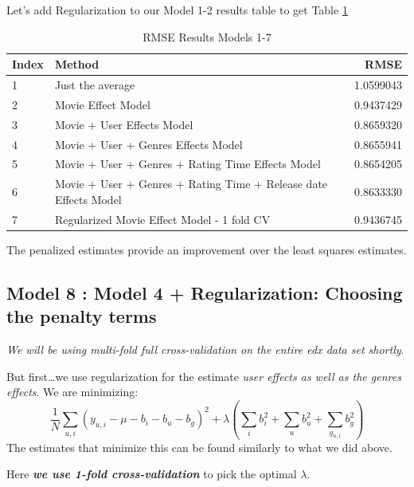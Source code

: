 \documentclass[
]{article}
\begin{document}
Let's add Regularization to our Model 1-2 results table to get Table
\ref{tbl:rmse_results_model_1-7}

\begin{table}[H]

\caption{\label{tab:m7_7}RMSE Results Models 1-7\label{tbl:rmse_results_model_1-7}}
\centering
\fontsize{7}{9}\selectfont
\begin{tabular}[t]{llr}
\toprule
Index & Method & RMSE\\
\midrule
1 & Just the average & 1.0599043\\
2 & Movie Effect Model & 0.9437429\\
3 & Movie + User Effects Model & 0.8659320\\
4 & Movie + User + Genres Effects Model & 0.8655941\\
5 & Movie + User + Genres + Rating Time Effects Model & 0.8654205\\
6 & Movie + User + Genres + Rating Time + Release date Effects Model & 0.8633330\\
7 & Regularized Movie Effect Model - 1 fold CV & 0.9436745\\
\bottomrule
\end{tabular}
\end{table}

The penalized estimates provide an improvement over the least squares
estimates.

\newpage

\hypertarget{model-8-model-4-regularization-choosing-the-penalty-terms}{%
\subsection{Model 8 : Model 4 + Regularization: Choosing the penalty
terms}\label{model-8-model-4-regularization-choosing-the-penalty-terms}}

\emph{We will be using multi-fold full cross-validation on the entire
edx data set shortly}.

But first\ldots we use regularization for the estimate \emph{user
effects as well as the genres effects}. We are minimizing:\\
\[\frac{1}{N}\sum_{u,i}(y_{u,i}-\mu-b_{i}-b_{u}-b_{g})^2+\lambda(\sum_{i}{b_{i}^2}+\sum_{u}{b_{u}^2}+\sum_{g_{u,i}}{b_{g}^2})\]
The estimates that minimize this can be found similarly to what we did
above.

Here \textbf{\emph{we use 1-fold cross-validation}} to pick the optimal
\(\lambda\).
\end{document}
